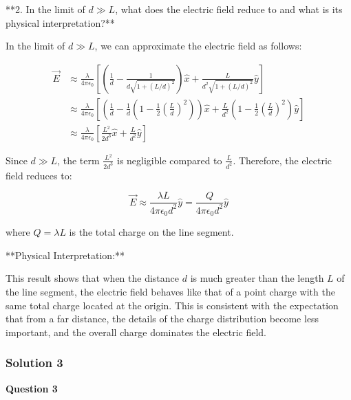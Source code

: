 \documentclass{article}
\begin{document}
**2. In the limit of \( d \gg L \), what does the electric field reduce to and what is its physical interpretation?**

In the limit of \(d \gg L\), we can approximate the electric field as follows:

\begin{align*}
\vec{E} &\approx \frac{\lambda}{4\pi\epsilon_0} \left[ \left(\frac{1}{d} - \frac{1}{d\sqrt{1 + (L/d)^2}}\right) \hat{x} + \frac{L}{d^2\sqrt{1 + (L/d)^2}} \hat{y} \right] \\
&\approx \frac{\lambda}{4\pi\epsilon_0} \left[ \left(\frac{1}{d} - \frac{1}{d}\left(1 - \frac{1}{2}\left(\frac{L}{d}\right)^2\right)\right) \hat{x} + \frac{L}{d^2}\left(1 - \frac{1}{2}\left(\frac{L}{d}\right)^2\right) \hat{y} \right] \\
&\approx \frac{\lambda}{4\pi\epsilon_0} \left[ \frac{L^2}{2d^3} \hat{x} + \frac{L}{d^2} \hat{y} \right]
\end{align*}

Since \(d \gg L\), the term \(\frac{L^2}{2d^3}\) is negligible compared to \(\frac{L}{d^2}\). Therefore, the electric field reduces to:

\begin{equation*}
\vec{E} \approx \frac{\lambda L}{4\pi\epsilon_0 d^2} \hat{y} = \frac{Q}{4\pi\epsilon_0 d^2} \hat{y}
\end{equation*}

where \(Q = \lambda L\) is the total charge on the line segment.

**Physical Interpretation:**

This result shows that when the distance \(d\) is much greater than the length \(L\) of the line segment, the electric field behaves like that of a point charge with the same total charge located at the origin. This is consistent with the expectation that from a far distance, the details of the charge distribution become less important, and the overall charge dominates the electric field.


\subsubsection{Solution 3}
\textbf{Question 3}
\end{document}
